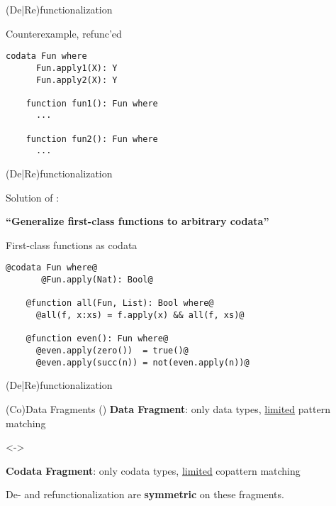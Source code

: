 \documentclass[xcolor=svgnames]{beamer}
\begin{document}
\begin{frame}[fragile]
  {(De|Re)functionalization}
  \begin{block}{Counterexample, refunc'ed}
    \begin{lstlisting}[escapechar=!]
    codata Fun where
      Fun.apply1(X): Y
      Fun.apply2(X): Y

    function fun1(): Fun where
      ...
    
    function fun2(): Fun where
      ...
    \end{lstlisting}
  \end{block}
\end{frame}

\begin{frame}[fragile]
  {(De|Re)functionalization}

Solution of \citet{rendel15automatic}: 

\textbf{``Generalize first-class functions to arbitrary codata''}

\begin{block}{First-class functions as codata}
    \begin{lstlisting}[style=base, gobble=4]
    @codata Fun where@
       @Fun.apply(Nat): Bool@

    @function all(Fun, List): Bool where@
      @all(f, x:xs) = f.apply(x) && all(f, xs)@

    @function even(): Fun where@
      @even.apply(zero())  = true()@
      @even.apply(succ(n)) = not(even.apply(n))@
    \end{lstlisting}
  \end{block}

\end{frame}

\begin{frame}
  {(De|Re)functionalization}

\begin{block}{(Co)Data Fragments (\citeauthor{rendel15automatic})}
  \textbf{Data Fragment}: only data types, \underline{limited} pattern matching

  <->

  \textbf{Codata Fragment}: only codata types, \underline{limited} copattern matching
\end{block}

De- and refunctionalization are \textbf{symmetric} on these fragments.

\end{frame}
\end{document}
